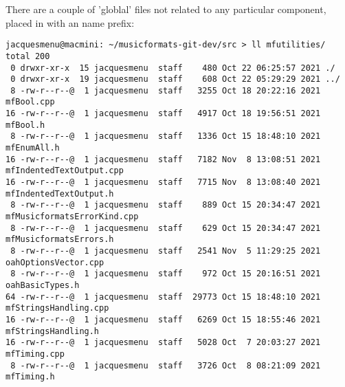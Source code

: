 There are a couple of 'globlal' files not related to any particular component, placed in \mfutilities{} with an  name prefix:
\begin{lstlisting}[language=Terminal]
jacquesmenu@macmini: ~/musicformats-git-dev/src > ll mfutilities/
total 200
 0 drwxr-xr-x  15 jacquesmenu  staff    480 Oct 22 06:25:57 2021 ./
 0 drwxr-xr-x  19 jacquesmenu  staff    608 Oct 22 05:29:29 2021 ../
 8 -rw-r--r--@  1 jacquesmenu  staff   3255 Oct 18 20:22:16 2021 mfBool.cpp
16 -rw-r--r--@  1 jacquesmenu  staff   4917 Oct 18 19:56:51 2021 mfBool.h
 8 -rw-r--r--@  1 jacquesmenu  staff   1336 Oct 15 18:48:10 2021 mfEnumAll.h
16 -rw-r--r--@  1 jacquesmenu  staff   7182 Nov  8 13:08:51 2021 mfIndentedTextOutput.cpp
16 -rw-r--r--@  1 jacquesmenu  staff   7715 Nov  8 13:08:40 2021 mfIndentedTextOutput.h
 8 -rw-r--r--@  1 jacquesmenu  staff    889 Oct 15 20:34:47 2021 mfMusicformatsErrorKind.cpp
 8 -rw-r--r--@  1 jacquesmenu  staff    629 Oct 15 20:34:47 2021 mfMusicformatsErrors.h
 8 -rw-r--r--@  1 jacquesmenu  staff   2541 Nov  5 11:29:25 2021 oahOptionsVector.cpp
 8 -rw-r--r--@  1 jacquesmenu  staff    972 Oct 15 20:16:51 2021 oahBasicTypes.h
64 -rw-r--r--@  1 jacquesmenu  staff  29773 Oct 15 18:48:10 2021 mfStringsHandling.cpp
16 -rw-r--r--@  1 jacquesmenu  staff   6269 Oct 15 18:55:46 2021 mfStringsHandling.h
16 -rw-r--r--@  1 jacquesmenu  staff   5028 Oct  7 20:03:27 2021 mfTiming.cpp
 8 -rw-r--r--@  1 jacquesmenu  staff   3726 Oct  8 08:21:09 2021 mfTiming.h
\end{lstlisting}

